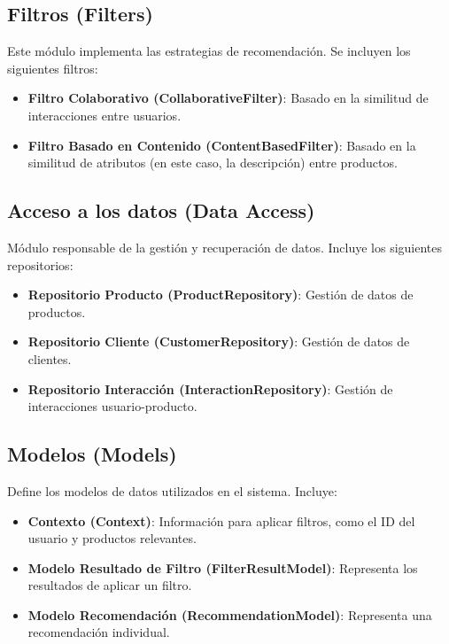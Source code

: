 \documentclass{llncs}
\begin{document}
\subsection{Filtros (Filters)}
Este módulo implementa las estrategias de recomendación. Se incluyen los siguientes filtros:

\begin{itemize}
    \item \textbf{Filtro Colaborativo (CollaborativeFilter)}: Basado en la similitud de interacciones entre usuarios.
    \item \textbf{Filtro Basado en Contenido (ContentBasedFilter)}: Basado en la similitud de atributos (en este caso, la descripción) entre productos.
\end{itemize}

\subsection{Acceso a los datos (Data Access)}
Módulo responsable de la gestión y recuperación de datos. Incluye los siguientes repositorios:

\begin{itemize}
    \item \textbf{Repositorio Producto (ProductRepository)}: Gestión de datos de productos.
    \item \textbf{Repositorio Cliente (CustomerRepository)}: Gestión de datos de clientes.
    \item \textbf{Repositorio Interacción (InteractionRepository)}: Gestión de interacciones usuario-producto.
\end{itemize}

\subsection{Modelos (Models)}
Define los modelos de datos utilizados en el sistema. Incluye:

\begin{itemize}
    \item \textbf{Contexto (Context)}: Información para aplicar filtros, como el ID del usuario y productos relevantes.
    \item \textbf{Modelo Resultado de Filtro (FilterResultModel)}: Representa los resultados de aplicar un filtro.
    \item \textbf{Modelo Recomendación (RecommendationModel)}: Representa una recomendación individual.
\end{itemize}
\end{document}
